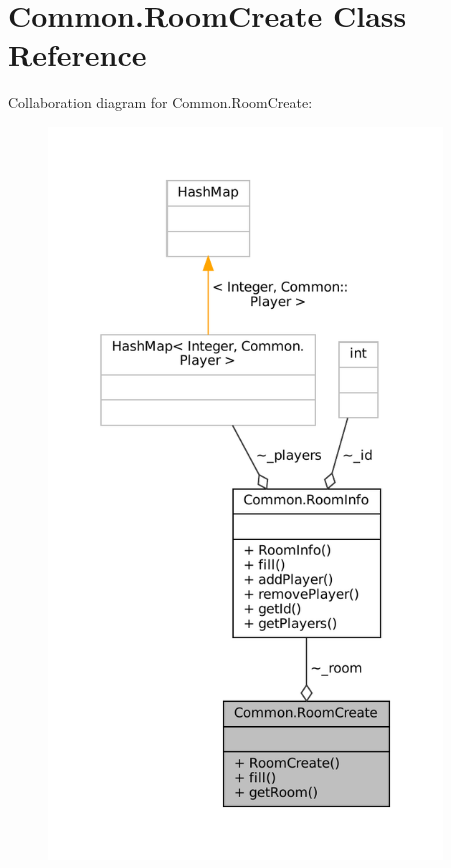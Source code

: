 \hypertarget{classCommon_1_1RoomCreate}{}\section{Common.\+Room\+Create Class Reference}
\label{classCommon_1_1RoomCreate}


Collaboration diagram for Common.\+Room\+Create\+:
\nopagebreak
\begin{figure}[H]
\begin{center}
\leavevmode
\includegraphics[height=550pt]{classCommon_1_1RoomCreate__coll__graph}
\end{center}
\end{figure}
